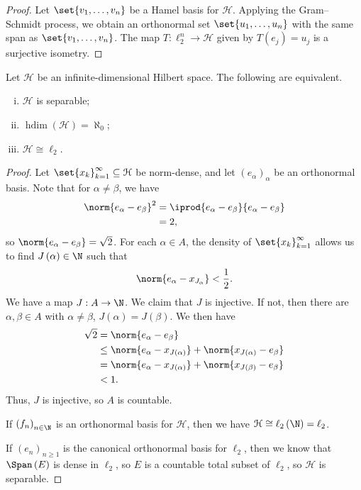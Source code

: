 \documentclass[10pt]{mypackage}
\DeclareMathOperator{\hdim}{hdim}
\begin{document}
\begin{proof}
  Let $\set{v_1,\dots,v_n}$ be a Hamel basis for $\mathcal{H}$. Applying the Gram--Schmidt process, we obtain an orthonormal set $\set{u_1,\dots,u_n}$ with the same span as $\set{v_1,\dots,v_n}$. The map $T\colon \ell_{2}^{n}\rightarrow \mathcal{H}$ given by $T\left(e_j\right) = u_j$ is a surjective isometry.
\end{proof}
\begin{proposition}
  Let $\mathcal{H}$ be an infinite-dimensional Hilbert space. The following are equivalent.
  \begin{enumerate}[(i)]
    \item $\mathcal{H}$ is separable;
    \item $\hdim\left(\mathcal{H}\right) = \aleph_0$;
    \item $\mathcal{H}\cong \ell_2$.
  \end{enumerate}
\end{proposition}
\begin{proof}
  Let $\set{x_k}_{k=1}^{\infty}\subseteq \mathcal{H}$ be norm-dense, and let $\left(e_{\alpha}\right)_{\alpha}$ be an orthonormal basis. Note that for $\alpha \neq \beta$, we have
  \begin{align*}
    \norm{e_{\alpha} - e_{\beta}}^2 &= \iprod{e_{\alpha} - e_{\beta}}{e_{\alpha} - e_{\beta}}\\
                                    &= 2,
  \end{align*}
  so $\norm{e_{\alpha} - e_{\beta}} = \sqrt{2}$. For each $\alpha \in A$, the density of $\set{x_k}_{k=1}^{\infty}$ allows us to find $J\left(\alpha\right)\in \N$ such that
  \begin{align*}
    \norm{e_{\alpha} - x_{J_{\alpha}}} < \frac{1}{2}.
  \end{align*}
  We have a map $J: A\rightarrow \N$. We claim that $J$ is injective. If not, then there are $\alpha,\beta \in A$ with $\alpha\neq \beta$, $J\left(\alpha\right) = J\left(\beta\right)$. We then have
  \begin{align*}
    \sqrt{2} &= \norm{e_{\alpha} - e_{\beta}}\\
             &\leq \norm{e_{\alpha} - x_{J\left(\alpha\right)}} + \norm{x_{J\left(\alpha\right)} - e_{\beta}}\\
             &= \norm{e_{\alpha} - x_{J\left(\alpha\right)}} + \norm{x_{J\left(\beta\right)} - e_{\beta}}\\
             &< 1.
  \end{align*}
  Thus, $J$ is injective, so $A$ is countable.\newline

  If $\left(f_n\right)_{n\in \N}$ is an orthonormal basis for $\mathcal{H}$, then we have $\mathcal{H} \cong \ell_2\left(\N\right) = \ell_2$.\newline

  If $\left(e_n\right)_{n\geq 1}$ is the canonical orthonormal basis for $\ell_2$, then we know that $\Span\left(E\right)$ is dense in $\ell_2$, so $E$ is a countable total subset of $\ell_2$, so $\mathcal{H}$ is separable.
\end{proof}
\end{document}
